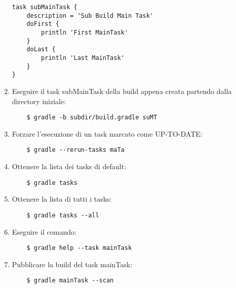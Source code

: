 \begin{enumerate}
\begin{lstlisting}[frame=single]
task subMainTask {
	description = 'Sub Build Main Task'
	doFirst {
		println 'First MainTask'
	}
	doLast {
		println 'Last MainTask'
	}
}
\end{lstlisting}
    \item Eseguire il task subMainTask della build appena creata partendo dalla directory iniziale:
\begin{verbatim}
    $ gradle -b subdir/build.gradle suMT        
\end{verbatim}
    \item Forzare l'esecuzione di un task marcato come UP-TO-DATE:
\begin{verbatim}
    $ gradle --rerun-tasks maTa
\end{verbatim}
    \item Ottenere la lista dei tasks di default:
\begin{verbatim}
    $ gradle tasks
\end{verbatim}
    \item Ottenere la lista di tutti i tasks:
\begin{verbatim}
    $ gradle tasks --all
\end{verbatim}
    \item Eseguire il comando:
\begin{verbatim}
    $ gradle help --task mainTask
\end{verbatim}
    \item Pubblicare la build del task mainTask:
\begin{verbatim}
    $ gradle mainTask --scan
\end{verbatim}
\end{enumerate}